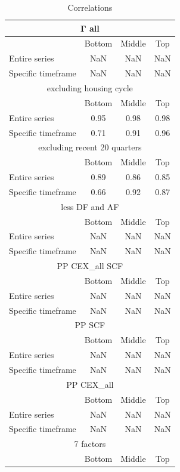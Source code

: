 \begin{table}[h!]
\centering
\caption{Correlations}
\begin{tabular}{|l|c|c|c|}
\hline
\multicolumn{4}{|c|}{Γ all} \\ \hline
& Bottom & Middle & Top \\ \hline
Entire series & NaN & NaN & NaN \\ \hline
Specific timeframe & NaN & NaN & NaN \\ \hline
\multicolumn{4}{|c|}{excluding housing cycle} \\ \hline
& Bottom & Middle & Top \\ \hline
Entire series & 0.95 & 0.98 & 0.98 \\ \hline
Specific timeframe & 0.71 & 0.91 & 0.96 \\ \hline
\multicolumn{4}{|c|}{excluding recent 20 quarters} \\ \hline
& Bottom & Middle & Top \\ \hline
Entire series & 0.89 & 0.86 & 0.85 \\ \hline
Specific timeframe & 0.66 & 0.92 & 0.87 \\ \hline
\multicolumn{4}{|c|}{less DF and AF} \\ \hline
& Bottom & Middle & Top \\ \hline
Entire series & NaN & NaN & NaN \\ \hline
Specific timeframe & NaN & NaN & NaN \\ \hline
\multicolumn{4}{|c|}{PP CEX_all SCF} \\ \hline
& Bottom & Middle & Top \\ \hline
Entire series & NaN & NaN & NaN \\ \hline
Specific timeframe & NaN & NaN & NaN \\ \hline
\multicolumn{4}{|c|}{PP SCF} \\ \hline
& Bottom & Middle & Top \\ \hline
Entire series & NaN & NaN & NaN \\ \hline
Specific timeframe & NaN & NaN & NaN \\ \hline
\multicolumn{4}{|c|}{PP CEX_all} \\ \hline
& Bottom & Middle & Top \\ \hline
Entire series & NaN & NaN & NaN \\ \hline
Specific timeframe & NaN & NaN & NaN \\ \hline
\multicolumn{4}{|c|}{7 factors} \\ \hline
& Bottom & Middle & Top \\ \hline

\end{tabular}
\end{table}
